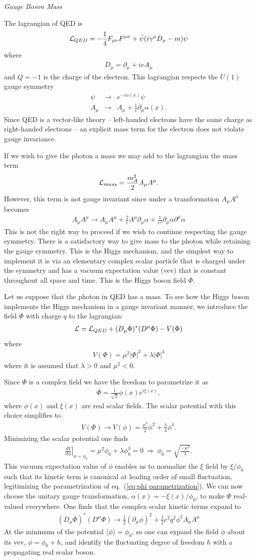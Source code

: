 \documentclass[12pt]{article}
\def\beq{\begin{eqnarray}}
\def\eeq{\end{eqnarray}}
\def\bea{\begin{eqnarray}}
\def\eq#1{eq.~(\ref{#1})}
\def\Dslash{\gamma^\mu D_\mu}
\begin{document}
\noindent
{\it Gauge Boson Mass}

The lagrangian of QED is
\beq
{\cal L}_{QED}=-\frac{1}{4}F_{\mu\nu}F^{\mu\nu}+\bar \psi (i\Dslash -m)\psi
\eeq
where 
\beq
D_\mu=\partial_\mu +ieA_\mu
\eeq
and $Q=-1$ is the charge of the electron.
This lagrangian respects the $U(1)$ gauge symmetry
\bea
\psi & \to & e^{-i\alpha(x)}\psi \\
A_\mu & \to & A_\mu+\frac{1}{e}\partial_\mu \alpha(x).
\eeq
Since QED is a vector-like theory -- left-handed electrons have the same charge as right-handed electrons --  an explicit mass term for the electron does not violate gauge invariance. 

If we wish to give the photon a mass we may add to the lagrangian the mass term
\beq
{\cal L}_{mass}=\frac{m_A^2}{2}A_\mu A^\mu .
\eeq
However, this term is not gauge invariant since under a transformation $A_\mu A^\mu$ becomes
\beq
A_\mu A^\mu\to A_\mu A^\mu+\frac{2}{e}A^\mu\partial_\mu\alpha+\frac{1}{e^2}\partial_\mu \alpha\partial^\mu\alpha
\eeq
This is not the right way to proceed if we wish to continue respecting the gauge symmetry. 
There is a satisfactory way to give mass to the photon while retaining the gauge symmetry. This is the Higgs mechanism, and the simplest way to implement it is via an elementary complex scalar particle that is charged under the symmetry and has a vacuum expectation value (vev) that is constant throughout all space and time.  This is the Higgs boson field $\Phi$.

Let us suppose that the photon in QED has a mass. To see how the Higgs boson implements the Higgs mechanism in a gauge invariant manner,  we 
introduce the field $\Phi$ with charge $q$  to the lagrangian:
\beq
{\cal L}={\cal L}_{QED}+(D_\mu\Phi)^*(D^\mu \Phi)-V(\Phi)
\eeq
where 
\beq
V(\Phi)=\mu^2|\Phi|^2+\lambda |\Phi|^4
\eeq
where it is assumed that $\lambda>0$ and $\mu^2<0$.  

Since $\Phi$ is a complex field we have the freedom to parametrize it as
\beq
\Phi=\frac{1}{\sqrt{2}}\phi(x) e^{i\xi(x)},
\label{eq:phi parametrization}
\eeq
where $\phi(x)$ and $\xi(x)$ are real scalar fields. The scalar potential with this choice simplifies to
\beq
V(\Phi)\to V(\phi)=\frac{\mu^2}{2}\phi^2+\frac{\lambda}{4}\phi^4.
\eeq
Minimizing the scalar potential one finds
\beq
\left. \frac{dV}{d\phi}\right|_{\phi=\phi_0}=\mu^2\phi_0+\lambda\phi^3_0=0~\Longrightarrow~ 
\phi_0=\sqrt{\frac{-\mu^2}{\lambda}}.
\eeq
This vacuum expectation value of $\phi$ enables us to normalize the $\xi$ field by $\xi/\phi_0$ such that its kinetic term is canonical at leading order of small fluctuation, legitimizing the parametrization of
\eq{eq:phi parametrization}. We can now choose the unitary gauge transformation, $\alpha(x)=-\xi(x)/\phi_0$, to make $\Phi$ real-valued everywhere.
One finds that the complex scalar kinetic terms expand to
\beq
(D_\mu\Phi)^*(D^\mu \Phi)\to \frac{1}{2}(\partial_\mu\phi)^2+\frac{1}{2}e^2q^2\phi^2A_\mu A^\mu
\eeq
At the minimum of the potential $\langle \phi\rangle =\phi_0$, so one can expand the field $\phi$ about its vev, $\phi=\phi_0+h$, and identify the fluctuating degree of freedom $h$ with a propagating real scalar boson. 
\end{document}
